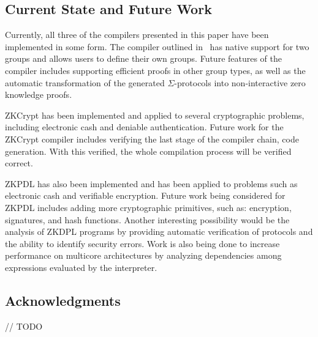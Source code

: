 \documentclass{sig-alternate}
\begin{document}
	\subsection{Current State and Future Work}
	Currently, all three of the compilers presented in this paper have
	been implemented in some form. The compiler outlined in~\cite{Sigma:2009}
	has native support for two groups and allows users to define their own
	groups. Future features of the compiler includes supporting efficient
	proofs in other group types, as well as the automatic transformation
	of the generated $\Sigma$-protocols into non-interactive zero knowledge
	proofs.
	
	ZKCrypt has been implemented and applied to several cryptographic
	problems, including electronic cash and deniable authentication.
	Future work for the ZKCrypt compiler includes verifying the last
	stage of the compiler chain, code generation. With this verified,
	the whole compilation process will be verified correct.
	
	ZKPDL has also been implemented and has been applied to problems
	such as electronic cash and verifiable encryption. Future work being
	considered for ZKPDL includes adding more cryptographic primitives,
	such as: encryption, signatures, and hash functions. Another interesting
	possibility would be the analysis of ZKDPL programs by providing automatic
	verification of protocols and the ability to identify security errors.
	Work is also being done to increase performance on multicore architectures
	by analyzing dependencies among expressions evaluated by the interpreter.	
	
	\subsection{Acknowledgments}
	// TODO




\end{document}
